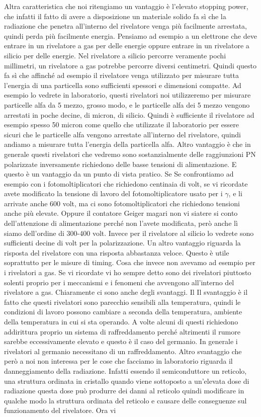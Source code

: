 {Altra caratteristica che noi ritengiamo un vantaggio è l'elevato stopping power, che infatti il fatto di avere a disposizione un materiale solido fa sì che la radiazione che penetra all'interno del rivelatore venga più facilmente arrestata, quindi perda più facilmente energia. Pensiamo ad esempio a un elettrone che deve entrare in un rivelatore a gas per delle energie oppure entrare in un rivelatore a silicio per delle energie. Nel rivelatore a silicio percorre veramente pochi millimetri, un rivelatore a gas potrebbe percorre diversi centimetri. Quindi questo fa sì che affinché ad esempio il rivelatore venga utilizzato per misurare tutta l'energia di una particella sono sufficienti spessori e dimensioni compatte. Ad esempio lo vedrete in laboratorio, questi rivelatori noi utilizzeremo per misurare particelle alfa da 5 mezzo, grosso modo, e le particelle alfa dei 5 mezzo vengono arrestati in poche decine, di micron, di silicio. Quindi è sufficiente il rivelatore ad esempio spesso 50 micron come quello che utilizzate il laboratorio per essere sicuri che le particelle alfa vengono arrestate all'interno del rivelatore, quindi andiamo a misurare tutta l'energia della particella alfa. Altro vantaggio è che in generale questi rivelatori che vedremo sono sostanzialmente delle raggiunzioni PN polarizzate inversamente richiedono delle basse tensioni di alimentazione. E questo è un vantaggio da un punto di vista pratico. Se Se confrontiamo ad esempio con i fotomoltiplicatori che richiedono centinaia di volt, se vi ricordate avete modificato la tensione di lavoro del fotomoltiplicatore usato per i $\gamma$, e li arrivate anche 600 volt, ma ci sono fotomoltiplicatori che richiedono tensioni anche più elevate. Oppure il contatore Geiger magari non vi siatere si conto dell'attenzione di alimentazione perché non l'avete modificata, però anche lì siamo dell'ordine di 300-400 volt. Invece per il rivelatore al silicio lo vedrete sono sufficienti decine di volt per la polarizzazione. Un altro vantaggio riguarda la risposta del rivelatore con una risposta abbastanza veloce. Questo è utile soprattutto per le misure di timing. Cosa che invece non avevamo ad esempio per i rivelatori a gas. Se vi ricordate vi ho sempre detto sono dei rivelatori piuttosto solenti proprio per i meccanismi e i fenomeni che avvengono all'interno del rivelatore a gas. Chiaramente ci sono anche degli svantaggi. Il Il svantaggio è il fatto che questi rivelatori sono parecchio sensibili alla temperatura, quindi le condizioni di lavoro possono cambiare a seconda della temperatura, ambiente della temperatura in cui si sta operando. A volte alcuni di questi richiedono addirittura proprio un sistema di raffreddamento perché altrimenti il rumore sarebbe eccessivamente elevato e questo è il caso del germanio. In generale i rivelatori al germanio necessitano di un raffreddamento. Altro svantaggio che però a noi non interessa per le cose che facciamo in laboratorio riguarda il danneggiamento della radiazione. Infatti essendo il semiconduttore un reticolo, una struttura ordinata in cristallo quando viene sottoposto a un'elevata dose di radiazione questa dose può produrre dei danni al reticolo quindi modificare in qualche modo la struttura ordinata del reticolo e causare delle conseguenze sul funzionamento del rivelatore. Ora vi }
